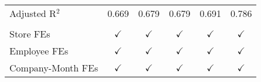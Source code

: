 \begin{tabular}{lccccc}
   Adjusted R$^2$          & 0.669         & 0.679          & 0.679          & 0.691          & 0.786\\  
    \\
   Store FEs               & $\checkmark$  & $\checkmark$   & $\checkmark$   & $\checkmark$   & $\checkmark$\\   
   Employee FEs            & $\checkmark$  & $\checkmark$   & $\checkmark$   & $\checkmark$   & $\checkmark$\\   
   Company-Month FEs       & $\checkmark$  & $\checkmark$   & $\checkmark$   & $\checkmark$   & $\checkmark$\\   
   \bottomrule
\end{tabular}
\par\endgroup


